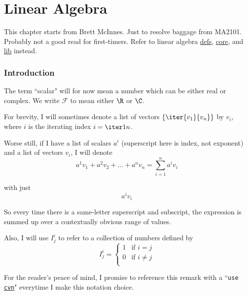 \chapter{Linear Algebra}\label{f9703fc}

This chapter starts from Brett McInnes. Just to resolve baggage from MA2101.
Probably not a good read for first-timers. Refer to linear algebra
\href{d146713}{defs}, \href{d8e4a4e}{core}, and \href{e74b000}{lib} instead.

\begin{toc}
\end{toc}

\def\F{\mathcal F}
\def\L{\mathcal L}
\def\cvn{\texttt{use \href{e8a1c30}{cvn};} }

\subsection{Introduction}\label{b061bfb}

\label{d029e34}

The term ``scalar" will for now mean a number which can be either real or
complex. We write $\F$ to mean either $\R$ or $\C$.

\label{e8a1c30}

For brevity, I will sometimes denote a list of vectors $\{\iter{v_1}{v_n}\}$ by
$v_i$, where $i$ is the iterating index $i=\iter1n$.

Worse still, if I have a list of scalars $a^i$ (superscript here is index, not
exponent) and a list of vectors $v_i$, I will denote
$$
  a^1v_1+a^2v_2+\ldots+a^nv_n=\sum_{i=1}^n a^iv_i
$$

with just
$$
  a^iv_i
$$

So every time there is a same-letter superscript and subscript, the expression
is summed up over a contextually obvious range of values.

Also, I will use $I^i_j$ to refer to a collection of numbers defined by
$$
  I^i_j=\begin{cases}
    1 & \text{if }i=j     \\
    0 & \text{if }i\neq j \\
  \end{cases}
$$

For the reader's peace of mind, I promise to reference this remark with a
``\texttt{use \href{e8a1c30}{cvn}}" everytime I make this notation choice.

